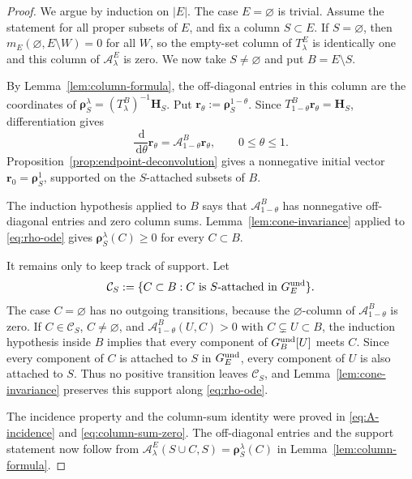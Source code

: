 \documentclass[11pt]{article}
\numberwithin{equation}{section}
\newcommand{\1}{\mathbf{1}}
\newcommand{\dd}{\,\mathrm d}
\newcommand{\Ac}{\mathcal A}
\newcommand{\br}{\mathbf r}
\newcommand{\bH}{\mathbf H}
\newcommand{\brho}{\boldsymbol{\rho}}
\begin{document}
\begin{proof}
We argue by induction on \(|E|\).  The case \(E=\varnothing\) is trivial.
Assume the statement for all proper subsets of \(E\), and fix a column
\(S\subset E\).  If \(S=\varnothing\), then
\(m_E(\varnothing,E\setminus W)=0\) for all \(W\), so the empty-set
column of \(T_\lambda^E\) is identically one and this column of
\(\Ac_\lambda^E\) is zero.  We now take \(S\ne\varnothing\) and put
\(B=E\setminus S\).

By Lemma~\ref{lem:column-formula}, the off-diagonal entries in this column
are the coordinates of
\(\brho_S^\lambda=(T_\lambda^B)^{-1}\bH_S\).  Put
\(\br_\theta:=\brho_S^{1-\theta}\).  Since
\(T_{1-\theta}^B\br_\theta=\bH_S\), differentiation gives
\begin{equation}\label{eq:rho-ode}
        \frac{\dd}{\dd\theta}\br_\theta
        =\Ac_{1-\theta}^B\br_\theta,
        \qquad 0\le\theta\le1 .
\end{equation}
Proposition~\ref{prop:endpoint-deconvolution} gives a nonnegative initial
vector \(\br_0=\brho_S^1\), supported on the \(S\)-attached subsets of \(B\).

The induction hypothesis applied to \(B\) says that
\(\Ac_{1-\theta}^B\) has nonnegative off-diagonal entries and zero column
sums.  Lemma~\ref{lem:cone-invariance} applied to \eqref{eq:rho-ode} gives
\(\brho_S^\lambda(C)\ge0\) for every \(C\subset B\).

It remains only to keep track of support.  Let
\[
        \mathcal C_S:=\{C\subset B:C\text{ is }S\text{-attached in }
        G_E^{\rm und}\} .
\]
The case \(C=\varnothing\) has no outgoing transitions, because the
\(\varnothing\)-column of \(\Ac_{1-\theta}^B\) is zero.  If
\(C\in\mathcal C_S\), \(C\ne\varnothing\), and
\(\Ac_{1-\theta}^B(U,C)>0\) with \(C\subsetneq U\subset B\), the induction
hypothesis inside \(B\) implies that every component of
\(G_B^{\rm und}[U]\) meets \(C\).  Since every component of \(C\) is attached
to \(S\) in \(G_E^{\rm und}\), every component of \(U\) is also attached to
\(S\).  Thus no positive transition leaves \(\mathcal C_S\), and
Lemma~\ref{lem:cone-invariance} preserves this support along
\eqref{eq:rho-ode}.

The incidence property and the column-sum identity were proved in
\eqref{eq:A-incidence} and \eqref{eq:column-sum-zero}.  The off-diagonal
entries and the support statement now follow from
\(\Ac_\lambda^E(S\cup C,S)=\brho_S^\lambda(C)\) in
Lemma~\ref{lem:column-formula}.
\end{proof}
\end{document}
